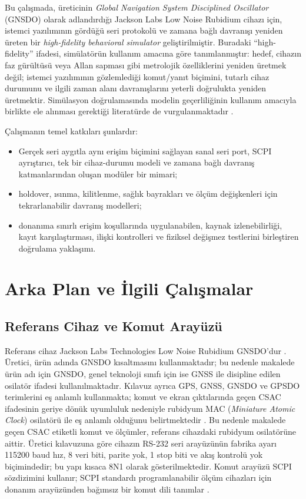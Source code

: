 \documentclass[9pt,twocolumn,a4paper]{extarticle}
\begin{document}
Bu çalışmada, üreticinin \emph{Global Navigation System Disciplined Oscillator} (GNSDO) olarak adlandırdığı Jackson Labs Low Noise Rubidium cihazı için, istemci yazılımının gördüğü seri protokolü ve zamana bağlı davranışı yeniden üreten bir \emph{high-fidelity behavioral simulator} geliştirilmiştir. Buradaki ``high-fidelity'' ifadesi, simülatörün kullanım amacına göre tanımlanmıştır: hedef, cihazın faz gürültüsü veya Allan sapması gibi metrolojik özelliklerini yeniden üretmek değil; istemci yazılımının gözlemlediği komut/yanıt biçimini, tutarlı cihaz durumunu ve ilgili zaman alanı davranışlarını yeterli doğrulukta yeniden üretmektir. Simülasyon doğrulamasında modelin geçerliliğinin kullanım amacıyla birlikte ele alınması gerektiği literatürde de vurgulanmaktadır \cite{sargent2013}.

Çalışmanın temel katkıları şunlardır:
\begin{itemize}
    \item Gerçek seri aygıtla aynı erişim biçimini sağlayan sanal seri port, SCPI ayrıştırıcı, tek bir cihaz-durumu modeli ve zamana bağlı davranış katmanlarından oluşan modüler bir mimari;
    \item holdover, ısınma, kilitlenme, sağlık bayrakları ve ölçüm değişkenleri için tekrarlanabilir davranış modelleri;
    \item donanıma sınırlı erişim koşullarında uygulanabilen, kaynak izlenebilirliği, kayıt karşılaştırması, ilişki kontrolleri ve fiziksel değişmez testlerini birleştiren doğrulama yaklaşımı.
\end{itemize}

\section{Arka Plan ve İlgili Çalışmalar}
\subsection{Referans Cihaz ve Komut Arayüzü}
Referans cihaz Jackson Labs Technologies Low Noise Rubidium GNSDO'dur \cite{jlt2015}. Üretici, ürün adında GNSDO kısaltmasını kullanmaktadır; bu nedenle makalede ürün adı için GNSDO, genel teknoloji sınıfı için ise GNSS ile disipline edilen osilatör ifadesi kullanılmaktadır.
Kılavuz ayrıca GPS, GNSS, GNSDO ve GPSDO terimlerini eş anlamlı kullanmakta; komut ve ekran çıktılarında geçen CSAC ifadesinin geriye dönük uyumluluk nedeniyle rubidyum MAC (\emph{Miniature Atomic Clock}) osilatörü ile eş anlamlı olduğunu belirtmektedir \cite{jlt2015}. Bu nedenle makalede geçen CSAC etiketli komut ve ölçümler, referans cihazdaki rubidyum osilatörüne aittir. Üretici kılavuzuna göre cihazın RS-232 seri arayüzünün fabrika ayarı 115200 baud hız, 8 veri biti, parite yok, 1 stop biti ve akış kontrolü yok biçimindedir; bu yapı kısaca 8N1 olarak gösterilmektedir. Komut arayüzü SCPI sözdizimini kullanır; SCPI standardı programlanabilir ölçüm cihazları için donanım arayüzünden bağımsız bir komut dili tanımlar \cite{scpi1999}.
\end{document}
